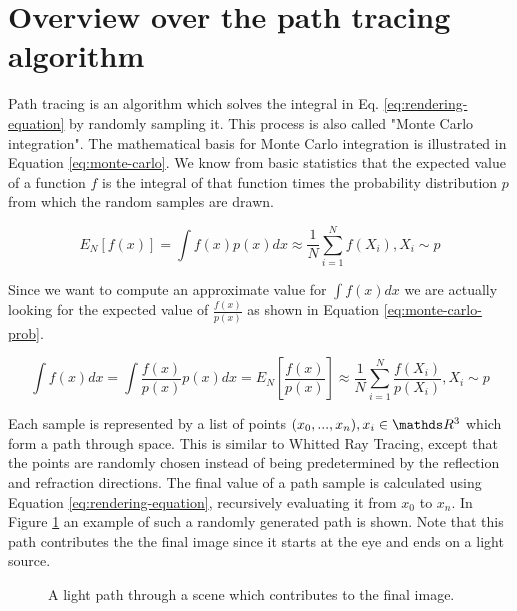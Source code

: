 \documentclass{ACGSeminar}
\begin{document}
\section{Overview over the path tracing algorithm} \label{path-tracing}
Path tracing is an algorithm which solves the integral in Eq. \eqref{eq:rendering-equation} by randomly sampling it. This process is also called "Monte Carlo integration". \cite{veach1997robust} 
The mathematical basis for Monte Carlo integration is illustrated in Equation \eqref{eq:monte-carlo}. We know from basic statistics that the expected value of a function $f$ is the integral of that function times the probability distribution $p$ from which the random samples are drawn.

\begin{equation}\label{eq:monte-carlo}
E_N[f(x)] = \int{f(x)p(x)dx} \approx \frac{1}{N} \sum_{i=1}^{N}{ f(X_i) }   , X_i \sim p 
\end{equation}

Since we want to compute an approximate value for $\int{f(x)dx}$ we are actually looking for the expected value of $\frac{f(x)}{p(x)}$ as shown in Equation \eqref{eq:monte-carlo-prob}.

\begin{equation}\label{eq:monte-carlo-prob}
\int{f(x)dx} = \int{\frac{f(x)}{p(x)}p(x)dx} = E_N[\frac{f(x)}{p(x)}] \approx \frac{1}{N} \sum_{i=1}^{N}{ \frac{f(X_i)}{p(X_i)} }   , X_i \sim p 
\end{equation}

Each sample is represented by a list of points $(x_0, ..., x_n), x_i \in \R^3$ which form a path through space. This is similar to Whitted Ray Tracing, except that the points are randomly chosen instead of being predetermined by the reflection and refraction directions. The final value of a path sample is calculated using Equation \eqref{eq:rendering-equation}, recursively evaluating it from $x_0$ to $x_n$. 
In Figure \ref{path-tracing} an example of such a randomly generated path is shown. Note that this path contributes the the final image since it starts at the eye and ends on a light source.

\begin{figure}[htb!]
  \centering
  
  \caption{A light path through a scene which contributes to the final image.}
  \label{fig:light-path}
\end{figure}
\end{document}
